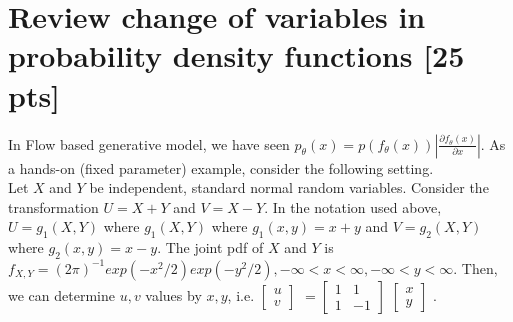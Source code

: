 \documentclass[a4paper]{article}
\theoremstyle{definition}
\newenvironment{soln}{
	\leavevmode\color{blue}\ignorespaces
}{}
\begin{document}
\begin{enumerate} [label=(\alph*)]
\begin{soln}
            \end{soln}
		
	\end{enumerate}

	\section{Review change of variables in probability density functions [25 pts]} In Flow based generative model, we have seen $p_{\theta}(x)=p(f_{\theta}(x))|\frac{\partial f_{\theta}(x)}{\partial x}|$. As a hands-on (fixed parameter) example, consider the following setting.\\
	Let $X$ and $Y$ be independent, standard normal random variables. Consider the transformation $U=X+Y$ and $V=X-Y$. In the notation used above, $U=g_{1}(X, Y)$ where $g_{1}(X, Y)$ where $g_{1}(x, y)=x+y$ and $V=g_{2}(X, Y)$ where $g_{2}(x,y)=x-y$. The joint pdf of $X$ and $Y$ is $f_{X, Y}=(2\pi)^{-1} exp(-x^{2}/2) exp(-y^{2}/2), -\infty < x < \infty, -\infty < y < \infty$. Then, we can determine $u, v$ values by $x, y$, i.e. 
	$
	\begin{bmatrix}
		u\\
		v
	\end{bmatrix}
	$
	$=\begin{bmatrix}
		1 & 1 \\ 
		1 & -1
	\end{bmatrix}
	$
	$
	\begin{bmatrix}
		x\\
		y
	\end{bmatrix}
	$
	.
	
\end{document}
